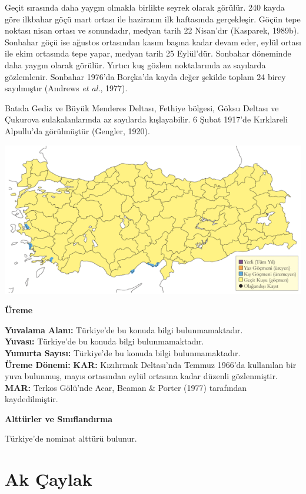 \documentclass[
  a4paper,
  DIV=11,
  numbers=noendperiod]{scrreprt}
\begin{document}
Geçit sırasında daha yaygın olmakla birlikte seyrek olarak görülür. 240
kayda göre ilkbahar göçü mart ortası ile haziranın ilk haftasında
gerçekleşir. Göçün tepe noktası nisan ortası ve sonundadır, medyan tarih
22 Nisan'dır (Kasparek, 1989b). Sonbahar göçü ise ağustos ortasından
kasım başına kadar devam eder, eylül ortası ile ekim ortasında tepe
yapar, medyan tarih 25 Eylül'dür. Sonbahar döneminde daha yaygın olarak
görülür. Yırtıcı kuş gözlem noktalarında az sayılarda gözlemlenir.
Sonbahar 1976'da Borçka'da kayda değer şekilde toplam 24 birey
sayılmıştır (Andrews \emph{et al.}, 1977).

Batıda Gediz ve Büyük Menderes Deltası, Fethiye bölgesi, Göksu Deltası
ve Çukurova sulakalanlarında az sayılarda kışlayabilir. 6 Şubat 1917'de
Kırklareli Alpullu'da görülmüştür (Gengler, 1920).

\includegraphics{images/harita_Page_081.png}

\textbf{Üreme}

\textbf{Yuvalama Alanı:} Türkiye'de bu konuda bilgi bulunmamaktadır.\\
\textbf{Yuvası:} Türkiye'de bu konuda bilgi bulunmamaktadır.\\
\textbf{Yumurta Sayısı:} Türkiye'de bu konuda bilgi bulunmamaktadır.\\
\textbf{Üreme Dönemi:} \textbf{KAR:} Kızılırmak Deltası'nda Temmuz
1966'da kullanılan bir yuva bulunmuş, mayıs ortasından eylül ortasına
kadar düzenli gözlenmiştir. \textbf{MAR:} Terkos Gölü'nde Acar, Beaman
\& Porter (1977) tarafından kaydedilmiştir.

\textbf{Alttürler ve Sınıflandırma}

Türkiye'de nominat alttürü bulunur.

\section{Ak Çaylak}\label{ak-uxe7aylak}
\end{document}
